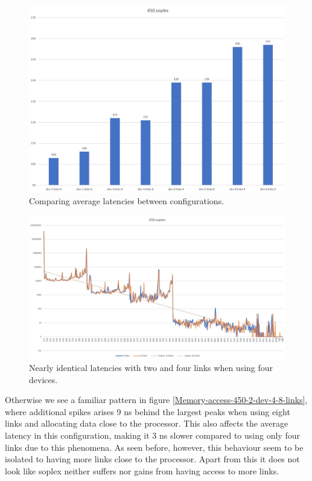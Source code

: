 \begin{figure}[!ht]
    \centering
    \includegraphics[width=0.75\linewidth]{figure/450-averages.jpg}
    \caption{Comparing average latencies between configurations.}
    \label{Memory-access-450-average-latency}
\end{figure}

\begin{figure}[!ht]
    \centering
    \includegraphics[width=0.75\linewidth]{figure/450-4_4-8.jpg}
    \caption{Nearly identical latencies with two and four links when using four devices.}
    \label{Memory-access-450-4-dev-4-8-links}
\end{figure}

Otherwise we see a familiar pattern in figure \ref{Memory-access-450-2-dev-4-8-links}, where additional spikes arises 9 ns behind the largest peaks when using eight links and allocating data close to the processor. This also affects the average latency in this configuration, making it 3 ns slower compared to using only four links due to this phenomena. As seen before, however, this behaviour seem to be isolated to having more links close to the processor. Apart from this it does not look like soplex neither suffers nor gains from having access to more links. 

